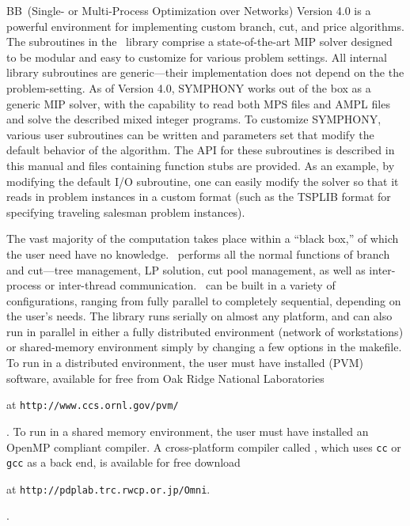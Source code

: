 BB\ (Single- or Multi-Process Optimization over Networks) Version 4.0 is a
powerful environment for implementing custom branch, cut, and price
algorithms. The subroutines in the \BB\ library comprise a state-of-the-art
MIP solver designed to be modular and easy to customize for various problem
settings. All internal library subroutines are generic---their implementation
does not depend on the the problem-setting. As of Version 4.0, SYMPHONY works
out of the box as a generic MIP solver, with the capability to read both MPS
files and AMPL files and solve the described mixed integer programs. To
customize SYMPHONY, various user subroutines can be written and parameters
set that modify the default behavior of the algorithm. The API for these
subroutines is described in this manual and files containing function stubs
are provided. As an example, by modifying the default I/O subroutine, one can
easily modify the solver so that it reads in problem instances in a custom
format (such as the TSPLIB format for specifying traveling salesman problem
instances).

The vast majority of the computation takes place within a ``black box,'' of
which the user need have no knowledge. \BB\ performs all the normal functions
of branch and cut---tree management, LP solution, cut pool management, as well
as inter-process or inter-thread communication. \BB\ can be built in a variety
of configurations, ranging from fully parallel to completely sequential,
depending on the user's needs. The library runs serially on almost any
platform, and can also run in parallel in either a fully distributed
environment (network of workstations) or shared-memory environment simply by
changing a few options in the makefile. To run in a distributed environment,
the user must have installed {\em
{}}
(PVM) software, available for free from Oak Ridge National Laboratories
\begin{latexonly}
at {\tt http://www.ccs.ornl.gov/pvm/} 
\end{latexonly}. 
To run in a shared memory environment, the user must have installed an
OpenMP compliant compiler. A cross-platform compiler called {\em
{}}, which uses 
{\tt cc} or {\tt gcc} as a back end, is available for free download
\begin{latexonly}
at {\tt http://pdplab.trc.rwcp.or.jp/Omni}.
\end{latexonly}.

